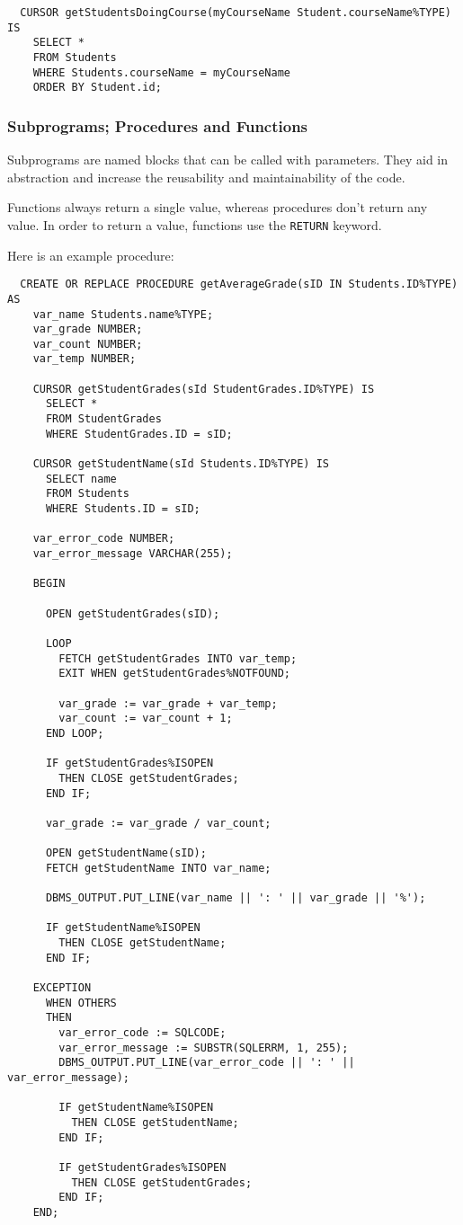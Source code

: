 \begin{verbatim}
  CURSOR getStudentsDoingCourse(myCourseName Student.courseName%TYPE) IS
    SELECT *
    FROM Students
    WHERE Students.courseName = myCourseName
    ORDER BY Student.id;
\end{verbatim}

\subsubsection{Subprograms; Procedures and Functions}

Subprograms are named blocks that can be called with parameters. They aid in
abstraction and increase the reusability and maintainability of the code.

Functions always return a single value, whereas procedures don't return any
value. In order to return a value, functions use the \texttt{RETURN} keyword.

Here is an example procedure:

\begin{verbatim}
  CREATE OR REPLACE PROCEDURE getAverageGrade(sID IN Students.ID%TYPE) AS
    var_name Students.name%TYPE;
    var_grade NUMBER;
    var_count NUMBER;
    var_temp NUMBER;

    CURSOR getStudentGrades(sId StudentGrades.ID%TYPE) IS
      SELECT *
      FROM StudentGrades
      WHERE StudentGrades.ID = sID;

    CURSOR getStudentName(sId Students.ID%TYPE) IS
      SELECT name
      FROM Students
      WHERE Students.ID = sID;

    var_error_code NUMBER;
    var_error_message VARCHAR(255);

    BEGIN

      OPEN getStudentGrades(sID);

      LOOP
        FETCH getStudentGrades INTO var_temp;
        EXIT WHEN getStudentGrades%NOTFOUND;

        var_grade := var_grade + var_temp;
        var_count := var_count + 1;
      END LOOP;

      IF getStudentGrades%ISOPEN
        THEN CLOSE getStudentGrades;
      END IF;

      var_grade := var_grade / var_count;
      
      OPEN getStudentName(sID);
      FETCH getStudentName INTO var_name;

      DBMS_OUTPUT.PUT_LINE(var_name || ': ' || var_grade || '%');

      IF getStudentName%ISOPEN
        THEN CLOSE getStudentName;
      END IF;

    EXCEPTION
      WHEN OTHERS
      THEN
        var_error_code := SQLCODE;
        var_error_message := SUBSTR(SQLERRM, 1, 255);
        DBMS_OUTPUT.PUT_LINE(var_error_code || ': ' || var_error_message);

        IF getStudentName%ISOPEN
          THEN CLOSE getStudentName;
        END IF;

        IF getStudentGrades%ISOPEN
          THEN CLOSE getStudentGrades;
        END IF;
    END;
\end{verbatim}

